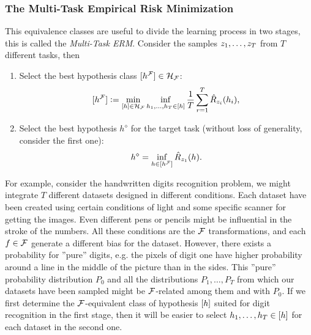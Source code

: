 \subsubsection*{The Multi-Task Empirical Risk Minimization}
This equivalence classes are useful to divide the learning process in two stages, this is called the \emph{Multi-Task ERM}. Consider the samples $z_1, \ldots, z_T$ from $T$ different tasks, then
\begin{enumerate}
    \item Select the best hypothesis class $\lbrack h^{\mathcal{F}}\rbrack \in \mathcal{H}_{\mathcal{F}}$:
    \begin{equation}
        \nonumber
        \lbrack h^{\mathcal{F}}\rbrack \vcentcolon= \min_{\lbrack h\rbrack \in \mathcal{H}_{\mathcal{F}}} \inf_{h_1, \ldots, h_T \in \lbrack h\rbrack} \frac{1}{T} \sum_{r=1}^T \hat{R}_{z_i}(h_i) ,
    \end{equation}
    \item Select the best hypothesis $h^\diamond$ for the target task (without loss of generality, consider the first one):
    \begin{equation}
        \nonumber
        h^\diamond = \inf_{h \in \lbrack h^{\mathcal{F}}\rbrack} \hat{R}_{z_1}(h) .
    \end{equation}
\end{enumerate}

For example, consider the handwritten digits recognition problem, we might integrate $T$ different datasets designed in different conditions. Each dataset have been created using certain conditions of light and some specific scanner for getting the images. Even different pens or pencils might be influential in the stroke of the numbers. All these conditions are the $\mathcal{F}$ transformations, and each $f \in \mathcal{F}$ generate a different bias for the dataset. However, there exists a probability for ''pure'' digits, e.g. the pixels of digit one have higher probability around a line in the middle of the picture than in the sides. This ''pure'' probability distribution $P_0$ and all the distributions $P_1, \ldots, P_T$ from which our datasets have been sampled might be $\mathcal{F}$-related among them and with $P_0$. If we first determine the $\mathcal{F}$-equivalent class of hypothesis $\lbrack h\rbrack$ suited for digit recognition in the first stage, then it will be easier to select $h_1, \ldots, h_T \in \lbrack h\rbrack$ for each dataset in the second one.

